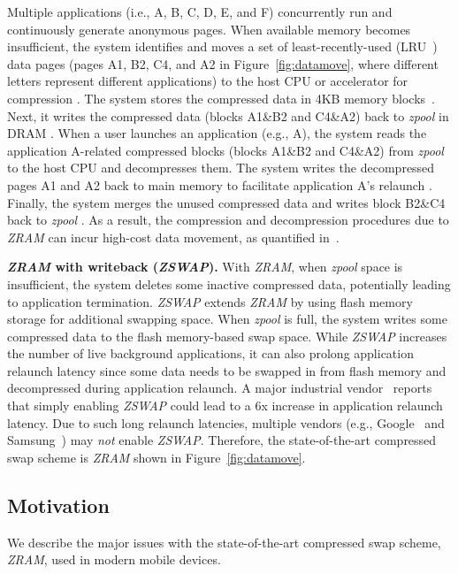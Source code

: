 Multiple applications (i.e., A, B, C, D, E, and F) concurrently run and continuously generate anonymous pages.  When available memory becomes insufficient, the system identifies and moves a set of least-recently-used (LRU~\cite{LRU}) data pages (pages A1, B2, C4, and A2 in Figure~\ref{fig:datamove}, where different letters represent different applications) to the host CPU or accelerator for compression .  The system stores the compressed data in 4KB memory blocks~\cite{ZRAMunit}. 
Next, it writes the compressed data (blocks A1\&B2 and C4\&A2) back to \emph{zpool} in DRAM . 
When a user launches an application (e.g., A), the system reads the application A-related compressed blocks (blocks A1\&B2 and C4\&A2) from  \emph{zpool} to the host CPU  and decompresses them. 
The system writes the decompressed pages A1 and A2 back to main memory to facilitate application A's relaunch . Finally, the system merges the unused compressed data and writes block B2\&C4 back to  \emph{zpool} . 
As a result, the compression and decompression procedures due to \emph{ZRAM} can incur high-cost data movement, as quantified in~\cite{googleworkloads}.

\noindent\textbf{ \emph{ZRAM} with writeback (\emph{ZSWAP}).} 
With  \emph{ZRAM}, when  \emph{zpool} space is insufficient, the system deletes some inactive compressed data, potentially leading to application termination. \emph{ZSWAP} extends  \emph{ZRAM} by using flash memory storage for additional swapping space. When  \emph{zpool} is full, the system writes some compressed data to the flash memory-based swap space. While \emph{ZSWAP} increases the number of live background applications, it can also prolong application relaunch latency since some data needs to be swapped in from flash memory and decompressed during application relaunch. A major industrial vendor~\cite{oppo} reports that simply enabling \emph{ZSWAP} could lead to a 6x increase in application relaunch latency.  Due to such long relaunch latencies,  multiple vendors (e.g., Google~\cite{Pixel5, Pixel7} and Samsung~\cite{Galaxys}) may \emph{not} enable \emph{ZSWAP}. Therefore, the state-of-the-art compressed swap scheme is \emph{ZRAM} shown in Figure~\ref{fig:datamove}.


\subsection{Motivation}
\label{subsec:motivation}

We describe the major issues with the state-of-the-art compressed swap scheme,  \emph{ZRAM}, used in modern mobile devices.

